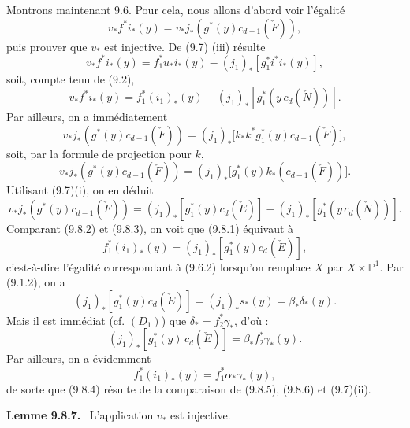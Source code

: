 \documentclass[11pt]{article}
\newenvironment{statement}[1]{\par\medskip\noindent\textbf{#1.}\ }{\par\medskip}
\begin{document}
Montrons maintenant 9.6. Pour cela, nous allons d'abord voir l'égalité
\[
v_*f^*i_*(y)=v_*j_*(g^*(y)c_{d-1}(\check F)),
\tag{9.8.1}
\]
puis prouver que $v_*$ est injective. De (9.7) (iii) résulte
\[
v_*f^*i_*(y)=f_1^*u_*i_*(y)-(j_1)_*[g_1^*i^*i_*(y)],
\]
soit, compte tenu de (9.2),
\[
v_*f^*i_*(y)=f_1^*(i_1)_*(y)-(j_1)_*[g_1^*(y\,c_d(\check N))].
\tag{9.8.2}
\]
Par ailleurs, on a immédiatement
\[
v_*j_*(g^*(y)c_{d-1}(\check F))
=(j_1)_*\bigl[k_*k^*g_1^*(y)c_{d-1}(\check F)\bigr],
\]
soit, par la formule de projection pour $k$,
\[
v_*j_*(g^*(y)c_{d-1}(\check F))
=(j_1)_*\bigl[g_1^*(y)k_*(c_{d-1}(\check F))\bigr].
\]
Utilisant (9.7)(i), on en déduit
\[
v_*j_*(g^*(y)c_{d-1}(\check F))
=(j_1)_*[g_1^*(y)c_d(\check E)]-(j_1)_*[g_1^*(y\,c_d(\check N))].
\tag{9.8.3}
\]
Comparant (9.8.2) et (9.8.3), on voit que (9.8.1) équivaut à
\[
f_1^*(i_1)_*(y)=(j_1)_*[g_1^*(y)c_d(\check E)],
\tag{9.8.4}
\]
c'est-à-dire l'égalité correspondant à (9.6.2) lorsqu'on remplace $X$ par $X\times\mathbb P^1$. Par (9.1.2), on a
\[
(j_1)_*[g_1^*(y)c_d(\check E)]=(j_1)_*s_*(y)=\beta_*\delta_*(y).
\]
Mais il est immédiat (cf. $(D_1)$) que $\delta_*=f_2^*\gamma_*$, d'où :
\[
(j_1)_*[g_1^*(y)\,c_d(\check E)]=\beta_*f_2^*\gamma_*(y).
\tag{9.8.5}
\]
Par ailleurs, on a évidemment
\[
f_1^*(i_1)_*(y)=f_1^*\alpha_*\gamma_*(y),
\tag{9.8.6}
\]
de sorte que (9.8.4) résulte de la comparaison de (9.8.5), (9.8.6) et (9.7)(ii).

\begin{statement}{Lemme 9.8.7}
L'application $v_*$ est injective.
\end{statement}
\end{document}
